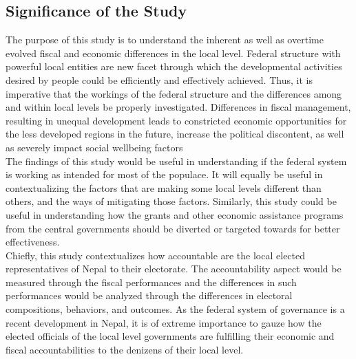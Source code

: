 \subsection{Significance of the Study}
The purpose of this study is to understand the inherent as well as overtime evolved fiscal and economic differences in the local level. Federal structure with powerful local entities are new facet through which the developmental activities desired by people could be efficiently and effectively achieved. Thus, it is imperative that the workings of the federal structure and the differences among and within local levels be properly investigated. Differences in fiscal management, resulting in unequal development leads to constricted economic opportunities for the less developed regions in the future, increase the political discontent, as well as severely impact social wellbeing factors\cite{Saey1998} \\
The findings of this study would be useful in understanding if the federal system is working as intended for most of the populace. It will equally be useful in contextualizing the factors that are making some local levels different than others, and the ways of mitigating those factors. Similarly, this study could be useful in understanding how the grants and other economic assistance programs from the central governments should be diverted or targeted towards for better effectiveness.\\
Chiefly, this study contextualizes how accountable are the local elected representatives of Nepal to their electorate. The accountability aspect would be measured through the fiscal performances and the differences in such performances would be analyzed through the differences in electoral compositions, behaviors, and outcomes. As the federal system of governance is a recent development in Nepal, it is of extreme importance to gauze how the elected officials of the local level governments are fulfilling their economic and fiscal accountabilities to the denizens of their local level. 
